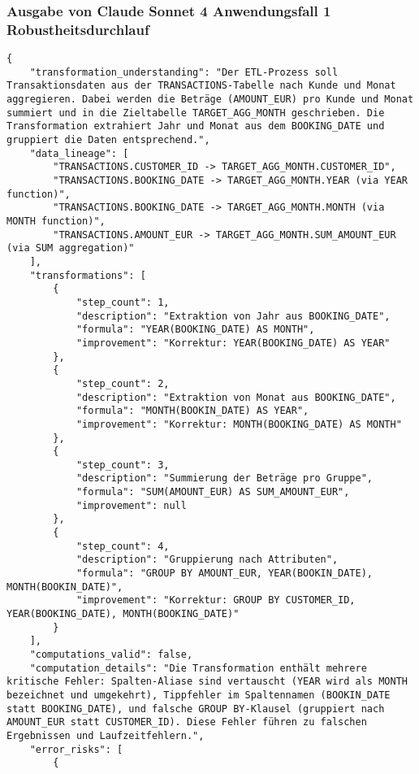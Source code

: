\subsubsection{Ausgabe von Claude Sonnet 4 Anwendungsfall 1 Robustheitsdurchlauf}\label{anhang:subsubsec:claude_case1_prompt3}
\begin{lstlisting}[caption={Ausgabe: Claude Sonnet 4 Anwendungsfall 1 Robustheitsdurchlauf},label={claude_case1_prompt3}]
{
    "transformation_understanding": "Der ETL-Prozess soll Transaktionsdaten aus der TRANSACTIONS-Tabelle nach Kunde und Monat aggregieren. Dabei werden die Beträge (AMOUNT_EUR) pro Kunde und Monat summiert und in die Zieltabelle TARGET_AGG_MONTH geschrieben. Die Transformation extrahiert Jahr und Monat aus dem BOOKING_DATE und gruppiert die Daten entsprechend.",
    "data_lineage": [
        "TRANSACTIONS.CUSTOMER_ID -> TARGET_AGG_MONTH.CUSTOMER_ID",
        "TRANSACTIONS.BOOKING_DATE -> TARGET_AGG_MONTH.YEAR (via YEAR function)",
        "TRANSACTIONS.BOOKING_DATE -> TARGET_AGG_MONTH.MONTH (via MONTH function)",
        "TRANSACTIONS.AMOUNT_EUR -> TARGET_AGG_MONTH.SUM_AMOUNT_EUR (via SUM aggregation)"
    ],
    "transformations": [
        {
            "step_count": 1,
            "description": "Extraktion von Jahr aus BOOKING_DATE",
            "formula": "YEAR(BOOKING_DATE) AS MONTH",
            "improvement": "Korrektur: YEAR(BOOKING_DATE) AS YEAR"
        },
        {
            "step_count": 2,
            "description": "Extraktion von Monat aus BOOKING_DATE",
            "formula": "MONTH(BOOKIN_DATE) AS YEAR",
            "improvement": "Korrektur: MONTH(BOOKING_DATE) AS MONTH"
        },
        {
            "step_count": 3,
            "description": "Summierung der Beträge pro Gruppe",
            "formula": "SUM(AMOUNT_EUR) AS SUM_AMOUNT_EUR",
            "improvement": null
        },
        {
            "step_count": 4,
            "description": "Gruppierung nach Attributen",
            "formula": "GROUP BY AMOUNT_EUR, YEAR(BOOKIN_DATE), MONTH(BOOKIN_DATE)",
            "improvement": "Korrektur: GROUP BY CUSTOMER_ID, YEAR(BOOKING_DATE), MONTH(BOOKING_DATE)"
        }
    ],
    "computations_valid": false,
    "computation_details": "Die Transformation enthält mehrere kritische Fehler: Spalten-Aliase sind vertauscht (YEAR wird als MONTH bezeichnet und umgekehrt), Tippfehler im Spaltennamen (BOOKIN_DATE statt BOOKING_DATE), und falsche GROUP BY-Klausel (gruppiert nach AMOUNT_EUR statt CUSTOMER_ID). Diese Fehler führen zu falschen Ergebnissen und Laufzeitfehlern.",
    "error_risks": [
        {

\end{lstlisting}
